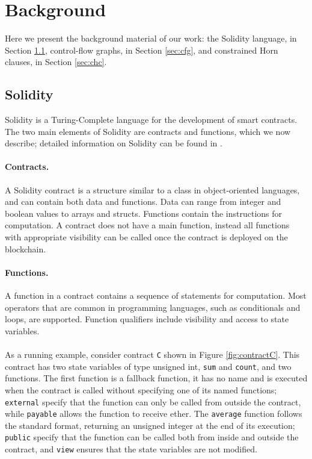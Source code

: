 \section{Background}

Here we present the background material of our work: the Solidity language, in Section \ref{sec:sol}, control-flow graphs, in Section \ref{sec:cfg}, and constrained Horn clauses, in Section \ref{sec:chc}.



\subsection{Solidity} \label{sec:sol}

Solidity is a Turing-Complete language for the development of smart contracts. The two main elements of Solidity are contracts and functions, which we now describe; detailed information on Solidity can be found in \cite{}. 

\paragraph{Contracts.} A Solidity contract is a structure similar to a class in object-oriented languages, and can contain both data and functions. Data can range from integer and boolean values to arrays and structs. Functions contain the instructions for computation. A contract does not have a main function, instead all functions with appropriate visibility can be called once the contract is deployed on the blockchain.

\paragraph{Functions.} A function in a contract contains a sequence of statements for computation. Most operators that are common in programming languages, such as conditionals and loops, are supported. Function qualifiers include visibility and access to state variables. 

\paragraph{} As a running example, consider contract \texttt{C} shown in Figure \ref{fig:contractC}. This contract has two state variables of type unsigned int, \texttt{sum} and \texttt{count}, and two functions. The first function is a fallback function, it has no name and is executed when the contract is called without specifying one of its named functions; \texttt{external} specify that the function can only be called from outside the contract, while \texttt{payable} allows the function to receive ether. The \texttt{average} function follows the standard format, returning an unsigned integer at the end of its execution; \texttt{public} specify that the function can be called both from inside and outside the contract, and \texttt{view} ensures that the state variables are not modified.


